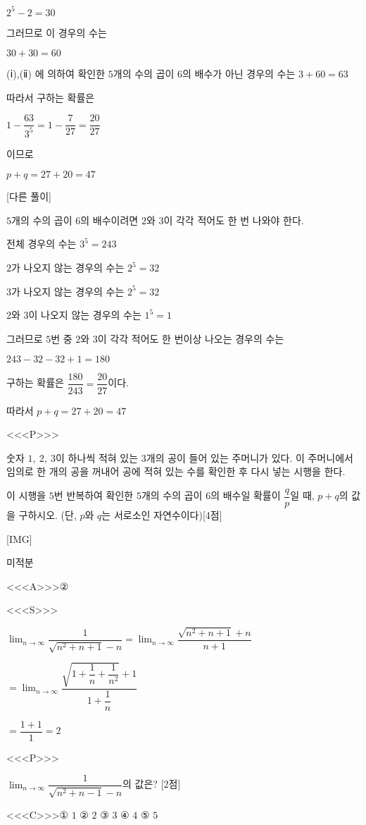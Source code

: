 \documentclass{oblivoir}
\begin{document}
$2^{5}-2=30$

그러므로 이 경우의 수는

$30+30=60$

(ⅰ),(ⅱ) 에 의하여 확인한 $5$개의 수의 곱이 $6$의 배수가 아닌 경우의 수는 $3+60=63$

따라서 구하는 확률은

$1-\dfrac{63}{3^{5}}=1-\dfrac{7}{27}=\dfrac{20}{27}$

이므로

$p+q=27+20=47$

[다른 풀이]

$5$개의 수의 곱이 $6$의 배수이려면 $2$와 $3$이 각각 적어도 한 번 나와야 한다.

전체 경우의 수는 $3^{5}=243$

$2$가 나오지 않는 경우의 수는 $2^{5}=32$

$3$가 나오지 않는 경우의 수는 $2^{5}=32$

$2$와 $3$이 나오지 않는 경우의 수는 $1^{5}=1$

그러므로 $5$번 중 $2$와 $3$이 각각 적어도 한 번이상 나오는 경우의 수는 

$243-32-32+1=180$

구하는 확률은 $\dfrac{180}{243}=\dfrac{20}{27}$이다.

따라서 $p+q=27+20=47$

<<<P>>>

숫자 $1,\: 2,\: 3$이 하나씩 적혀 있는 $3$개의 공이 들어 있는 주머니가 있다. 이 주머니에서 임의로 한 개의 공을 꺼내어 공에 적혀 있는 수를 확인한 후 다시 넣는 시행을 한다.

이 시행을 $5$번 반복하여 확인한 $5$개의 수의 곱이 $6$의 배수일 확률이 $\dfrac{q}{p}$일 때, $p+q$의 값을 구하시오. (단, $p$와 $q$는 서로소인 자연수이다)[4점]

[IMG]

미적분

<<<A>>>②

<<<S>>>

$\displaystyle\lim_{n\to \infty}\dfrac{1}{\sqrt{n^{2}+n+1}-n}$$=\displaystyle\lim_{n\to \infty}\dfrac{\sqrt{n^{2}+n+1}+n}{n+1}$

$=\displaystyle\lim_{n\to \infty}\dfrac{\sqrt{1 +\dfrac{1}{n}+\dfrac{1}{n^{2}}}+1}{1+\dfrac{1}{n}}$

$=\dfrac{1+1}{1}=2$

<<<P>>>

$\displaystyle\lim_{n\to \infty}$$\dfrac{1}{\sqrt{n^{2}+n-1}-n}$의 값은? [2점]

<<<C>>>① $1$ ② $2$ ③ $3$ ④ $4$ ⑤ $5$
\end{document}
